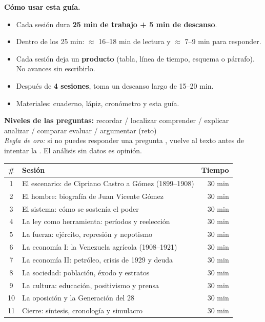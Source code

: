 \documentclass[12pt, letterpaper]{article}
\begin{document}
\begin{cuadroteoria}
  \small
  \textbf{Cómo usar esta guía.}
  \begin{itemize}[leftmargin=*, itemsep=2pt, topsep=2pt]
    \item Cada sesión dura \textbf{25 min de trabajo + 5 min de descanso}.
    \item Dentro de los 25 min: $\approx$ 16--18 min de lectura y
          $\approx$ 7--9 min para responder.
    \item Cada sesión deja un \textbf{producto} (tabla, línea de tiempo,
          esquema o párrafo). No avances sin escribirlo.
    \item Después de \textbf{4 sesiones}, toma un descanso largo de 15--20 min.
    \item Materiales: cuaderno, lápiz, cronómetro y esta guía.
  \end{itemize}
  \vspace{2pt}
  \textbf{Niveles de las preguntas:}\quad
  \facil{} recordar / localizar \quad
  \medio{} comprender / explicar \\
  \dificil{} analizar / comparar \quad
  \muyDificil{} evaluar / argumentar (reto)
  \\[3pt]
  \textit{Regla de oro:} si no puedes responder una pregunta \facil{}, vuelve al
  texto antes de intentar la \muyDificil{}. El análisis sin datos es opinión.
\end{cuadroteoria}

\vspace{4pt}

\begin{center}
\small
\begin{tabular}{@{}c p{12.4cm} r@{}}
  \toprule
  \textbf{\#} & \textbf{Sesión} & \textbf{Tiempo} \\
  \midrule
  1  & El escenario: de Cipriano Castro a Gómez (1899--1908) & 30 min \\
  2  & El hombre: biografía de Juan Vicente Gómez            & 30 min \\
  3  & El sistema: cómo se sostenía el poder                 & 30 min \\
  4  & La ley como herramienta: períodos y reelección        & 30 min \\
  5  & La fuerza: ejército, represión y nepotismo            & 30 min \\
  6  & La economía I: la Venezuela agrícola (1908--1921)     & 30 min \\
  7  & La economía II: petróleo, crisis de 1929 y deuda      & 30 min \\
  8  & La sociedad: población, éxodo y estratos              & 30 min \\
  9  & La cultura: educación, positivismo y prensa           & 30 min \\
  10 & La oposición y la Generación del 28                   & 30 min \\
  11 & Cierre: síntesis, cronología y simulacro              & 30 min \\
  \bottomrule
\end{tabular}
\end{center}
\end{document}
